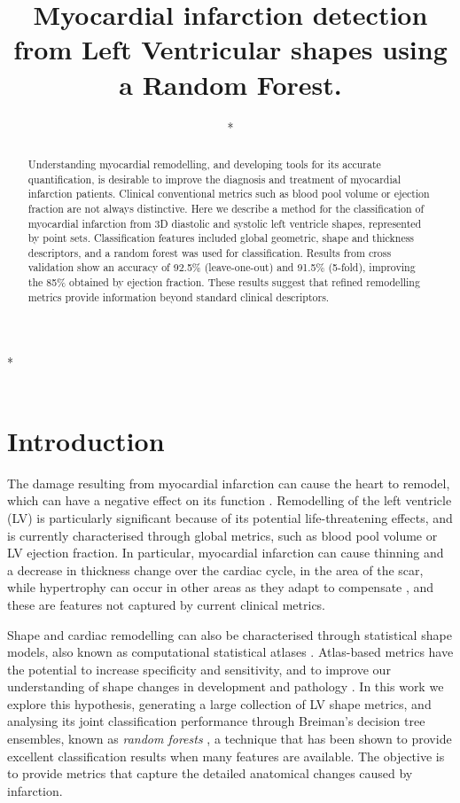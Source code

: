 \documentclass{llncs}
\begin{document}
\title{Myocardial infarction detection from Left Ventricular shapes using a Random Forest.}

\author{*}

\institute
{*\\
\email{*}\\
}
\maketitle              %
\begin{abstract}
Understanding myocardial remodelling, and developing tools for its accurate quantification, is desirable to improve the diagnosis and treatment of myocardial infarction patients. Clinical conventional metrics such as blood pool volume or ejection fraction are not always distinctive. Here we describe a method for the classification of myocardial infarction from 3D diastolic and systolic left ventricle shapes, represented by point sets. Classification features included global geometric, shape and thickness descriptors, and a random forest was used for classification. Results from cross validation show an accuracy of 92.5\% (leave-one-out) and 91.5\% (5-fold), improving the 85\% obtained by ejection fraction. These results suggest that refined remodelling metrics provide information beyond standard clinical descriptors.

\end{abstract}
%
\section{Introduction}
The damage resulting from myocardial infarction can cause the heart to remodel, which can have a negative effect on its function \cite{Sutton2000}. Remodelling of the left ventricle (LV) is particularly significant because of its potential life-threatening effects, and is currently characterised through global metrics, such as blood pool volume or LV ejection fraction. In particular, myocardial infarction can cause thinning and a decrease in thickness change over the cardiac cycle, in the area of the scar, while hypertrophy can occur in other areas as they adapt to compensate \cite{Sutton2000}, and these are features not captured by current clinical metrics. 

 

Shape and cardiac remodelling can also be characterised through statistical shape models, also known as computational statistical atlases \cite{Cootes1992,Young2009}. Atlas-based metrics have the potential to increase  specificity and sensitivity, and to improve our understanding of shape changes in development and pathology \cite{Lewandowski2012,Lorenz2006}. In this work we explore this hypothesis, generating a large collection of LV shape metrics, and analysing its joint classification performance through Breiman's decision tree ensembles, known as \emph{random forests} \cite{Breiman2001}, a technique that has been shown to provide excellent classification results when many features are available. The objective is to provide metrics that capture the detailed anatomical changes caused by infarction.
\end{document}

